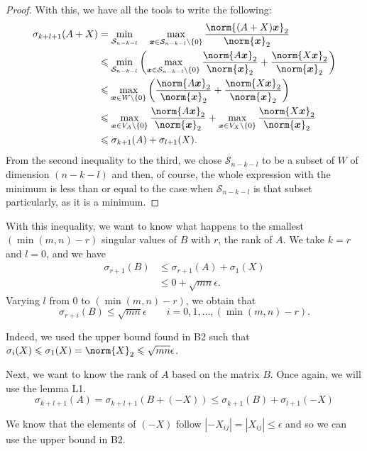 \documentclass[11pt]{article}
\newcommand{\abs}[1]{\left\lvert#1\right\lvert}
\newcommand{\snorm}[1]{\norm{#1}_2} %
\begin{document}
\begin{proof}
With this, we have all the tools to write the following:
\begin{align*}
\sigma_{k+l + 1}(A+X) &= \min_{\mathcal{S}_{n-k-l}} \quad \max_{\bm{x} \in \mathcal{S}_{n-k-l} \setminus \{0\}} \frac{\snorm{(A+X)\bm{x}}}{\snorm{\bm{x}}}\\
&\leqslant \min_{\mathcal{S}_{n-k-l}} \left( \max_{\bm{x} \in \mathcal{S}_{n-k-l} \setminus \{0\}} \frac{\snorm{A\bm{x}}}{\snorm{\bm{x}}} + \frac{\snorm{X\bm{x}}}{\snorm{\bm{x}}} \right)\\
&\leqslant \max_{\bm{x} \in W \setminus \{0\}}\left( \frac{\snorm{A\bm{x}}}{\snorm{\bm{x}}} + \frac{\snorm{X\bm{x}}}{\snorm{\bm{x}}}\right)\\
&\leqslant \max_{\bm{x} \in V_A \setminus \{0\}} \frac{\snorm{A\bm{x}}}{\snorm{\bm{x}}} + \max_{\bm{x} \in V_X \setminus \{0\}} \frac{\snorm{X\bm{x}}}{\snorm{\bm{x}}}\\
&\leqslant \sigma_{k+1}(A) + \sigma_{l+1}(X).
\end{align*}
From the second inequality to the third, we chose $\mathcal{S}_{n-k-l}$ to be a subset of \(W\) of dimension $(n-k-l)$ and then, of course, the whole expression with the minimum is less than or equal to the case when $\mathcal{S}_{n-k-l}$ is that subset particularly, as it is a minimum.
\end{proof}

With this inequality, we want to know what happens to the smallest $(\min(m,n)-r)$ singular values of \(B\) with \(r\), the rank of \(A\).
We take $k=r$ and $l=0$, and we have 
\begin{align}
\sigma_{r+1}(B) &\leqslant \sigma_{r+1}(A) + \sigma_{1}(X)\\
&\leqslant 0 + \sqrt{mn}\epsilon.
\end{align}
Varying $l$ from $0$ to $(\min(m,n)-r)$, we obtain that 
\[\sigma_{r+i}(B) \leqslant \sqrt{mn}\epsilon \qquad i = 0,1, \dots, (\min(m,n)-r).
\]

Indeed, we used the upper bound found in B2 such that $\sigma_i(X)\leqslant \sigma_1(X)= \snorm{X}\leqslant \sqrt{mn}\epsilon$.

Next, we want to know the rank of \(A\) based on the matrix \(B\). Once again, we will use the lemma L1.
\[
\sigma_{k+l + 1}(A) =  \sigma_{k+l + 1}(B+(-X))
\leqslant \sigma_{k+1}(B) + \sigma_{l+1}(-X)
\]

We know that the elements of $(-X)$ follow $ \abs{-X_{ij}} = \abs{X_{ij}} \leqslant \epsilon$ and so we can use the upper bound in B2.
\end{document}
